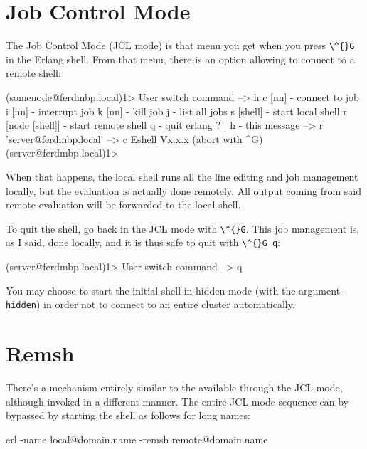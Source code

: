 \documentclass[11pt, oneside]{book}   	%
\newcommand{\command}[1]{\Verb`#1`}
\begin{document}
\section{Job Control Mode}

The Job Control Mode (JCL mode) is that menu you get when you press \command{\^{}G} in the Erlang shell. From that menu, there is an option allowing to connect to a remote shell:

\begin{VerbatimEshell}
(somenode@ferdmbp.local)1>
User switch command
 --> h
  c [nn]            - connect to job
  i [nn]            - interrupt job
  k [nn]            - kill job
  j                 - list all jobs
  s [shell]         - start local shell
  r [node [shell]]  - start remote shell
  q        - quit erlang
  ? | h             - this message
 --> r 'server@ferdmbp.local'
 --> c
Eshell Vx.x.x  (abort with ^G)
(server@ferdmbp.local)1>
\end{VerbatimEshell}

When that happens, the local shell runs all the line editing and job management locally, but the evaluation is actually done remotely. All output coming from said remote evaluation will be forwarded to the local shell.

To quit the shell, go back in the JCL mode with \command{\^{}G}. This job management is, as I said, done locally, and it is thus safe to quit with \command{\^{}G q}:

\begin{VerbatimEshell}
(server@ferdmbp.local)1>
User switch command
 --> q
\end{VerbatimEshell}

You may choose to start the initial shell in hidden mode (with the argument \command{-hidden}) in order not to connect to an entire cluster automatically.

\section{Remsh}

There's a mechanism entirely similar to the available through the JCL mode, although invoked in a different manner. The entire JCL mode sequence can by bypassed by starting the shell as follows for long names:

\begin{VerbatimText}
erl -name local@domain.name -remsh remote@domain.name
\end{VerbatimText}
\end{document}
